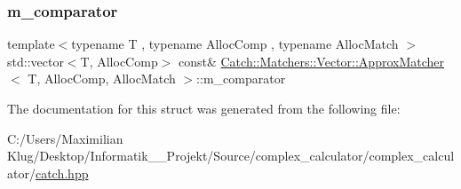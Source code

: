 \mbox{\label{struct_catch_1_1_matchers_1_1_vector_1_1_approx_matcher_a482a43ccf47697830d23bf0beaf06b9b}} 
\subsubsection{\texorpdfstring{m\+\_\+comparator}{m\_comparator}}
{\footnotesize\ttfamily template$<$typename T , typename Alloc\+Comp , typename Alloc\+Match $>$ \\
std\+::vector$<$T, Alloc\+Comp$>$ const\& \mbox{\hyperlink{struct_catch_1_1_matchers_1_1_vector_1_1_approx_matcher}{Catch\+::\+Matchers\+::\+Vector\+::\+Approx\+Matcher}}$<$ T, Alloc\+Comp, Alloc\+Match $>$\+::m\+\_\+comparator}



The documentation for this struct was generated from the following file\+:\begin{DoxyCompactItemize}
\item 
C\+:/\+Users/\+Maximilian Klug/\+Desktop/\+Informatik\+\_\+\_\+\+Projekt/\+Source/complex\+\_\+calculator/complex\+\_\+calculator/\mbox{\hyperlink{catch_8hpp}{catch.\+hpp}}\end{DoxyCompactItemize}
